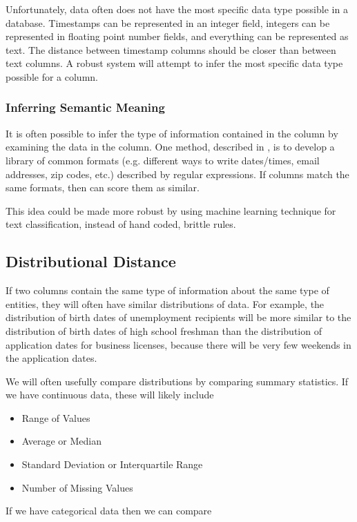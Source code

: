 \documentclass{datamade}
\theoremstyle{definition}
\theoremstyle{remark}
\begin{document}
Unfortunately, data often does not have the most specific data type
possible in a database. Timestamps can be represented in
an integer field, integers can be represented in floating point number
fields, and everything can be represented as text. The distance
between timestamp columns should be closer than between text
columns. A robust system will attempt to infer the most
specific data type possible for a column.

\subsubsection*{Inferring Semantic Meaning}
It is often possible to infer the type of information contained in the
column by examining the data in the column. One method,
described in \cite{regex}, is to develop a library of common formats
(e.g. different ways to write dates/times, email addresses, zip codes,
etc.) described by regular expressions. If columns match the same
formats, then can score them as similar.

This idea could be made more robust by using machine learning
technique for text classification, instead of hand coded, brittle rules.

\subsection*{Distributional Distance}
If two columns contain the same type of information about the same
type of entities, they will often have similar distributions of
data. For example, the distribution of birth dates of unemployment
recipients will be more similar to the distribution of birth dates of
high school freshman than the distribution of application dates for
business licenses, because there will be very few weekends in the
application dates.

We will often usefully compare distributions by comparing summary
statistics. If we have continuous data, these will likely include

\begin{itemize}
\item Range of Values
\item Average or Median
\item Standard Deviation or Interquartile Range
\item Number of Missing Values
\end{itemize}

If we have categorical data then we can compare
\end{document}
